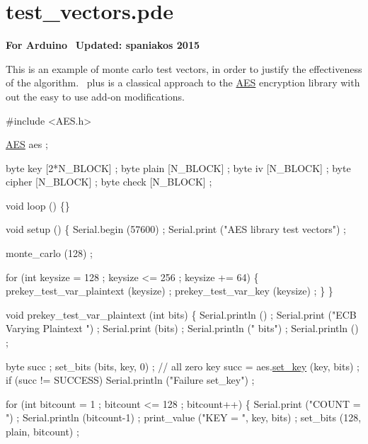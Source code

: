 \hypertarget{test_vectors_8pde-example}{}\section{test\+\_\+vectors.\+pde}
{\bfseries For Arduino}~\newline
 {\bfseries Updated\+: spaniakos 2015 }~\newline


This is an example of monte carlo test vectors, in order to justify the effectiveness of the algorithm.~\newline
 plus is a classical approach to the \hyperlink{classAES}{A\+ES} encryption library with out the easy to use add-\/on modifications.


\begin{DoxyCodeInclude}
\textcolor{preprocessor}{#include <AES.h>}

\hyperlink{classAES}{AES} aes ;

byte key [2*N\_BLOCK] ;
byte plain [N\_BLOCK] ;
byte iv [N\_BLOCK] ;
byte cipher [N\_BLOCK] ;
byte check [N\_BLOCK] ;

\textcolor{keywordtype}{void} loop () 
\{\}


\textcolor{keywordtype}{void} setup ()
\{
  Serial.begin (57600) ;
  Serial.print (\textcolor{stringliteral}{"AES library test vectors"}) ;

  monte\_carlo (128) ;

  \textcolor{keywordflow}{for} (\textcolor{keywordtype}{int} keysize = 128 ; keysize <= 256 ; keysize += 64)
    \{
      prekey\_test\_var\_plaintext (keysize) ;
      prekey\_test\_var\_key (keysize) ;
    \}
\}


\textcolor{keywordtype}{void} prekey\_test\_var\_plaintext (\textcolor{keywordtype}{int} bits)
\{
  Serial.println () ;
  Serial.print (\textcolor{stringliteral}{"ECB Varying Plaintext "}) ;
  Serial.print (bits) ;
  Serial.println (\textcolor{stringliteral}{" bits"}) ;
  Serial.println () ;
 
  byte succ ;
  set\_bits (bits, key, 0) ;  \textcolor{comment}{// all zero key}
  succ = aes.\hyperlink{classAES_afe2900d46f475f6f3ea8d164e1581ed9}{set\_key} (key, bits) ;
  \textcolor{keywordflow}{if} (succ != SUCCESS)
    Serial.println (\textcolor{stringliteral}{"Failure set\_key"}) ;


  \textcolor{keywordflow}{for} (\textcolor{keywordtype}{int} bitcount = 1 ; bitcount <= 128 ; bitcount++)
    \{
      Serial.print (\textcolor{stringliteral}{"COUNT = "}) ; Serial.println (bitcount-1) ;
      print\_value (\textcolor{stringliteral}{"KEY = "}, key, bits) ;
      set\_bits (128, plain, bitcount) ;
      

\end{DoxyCodeInclude}
